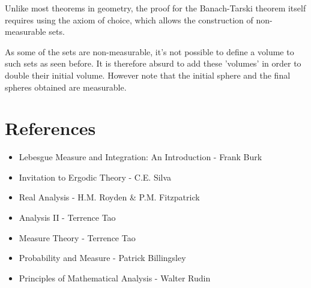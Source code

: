 \documentclass{article}
\begin{document}
Unlike most theorems in geometry, the proof for the Banach-Tarski theorem itself requires using the axiom of choice, which allows the construction of non-measurable sets.

As some of the sets are non-measurable, it's not possible to define a volume to such sets as seen before. It is therefore absurd to add these 'volumes' in order to double their initial volume. However note that the initial sphere and the final spheres obtained are measurable.








\newpage
\section{References}
\begin{itemize}
    \item Lebesgue Measure and Integration: An Introduction - Frank Burk
    \item Invitation to Ergodic Theory - C.E. Silva
    \item Real Analysis - H.M. Royden \& P.M. Fitzpatrick
    \item Analysis II - Terrence Tao
    \item Measure Theory - Terrence Tao
    \item Probability and Measure - Patrick Billingsley
    \item Principles of Mathematical Analysis - Walter Rudin
\end{itemize}
\end{document}
